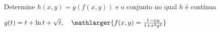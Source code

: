 Determine $h(x,y) = g(f(x,y))$ e o conjunto no qual $h$ é contínua

\item $g(t)=t+\ln t + \sqrt t, \quad \mathlarger{f(x,y)=\frac{1-xy}{1+x^2y^2}}$

